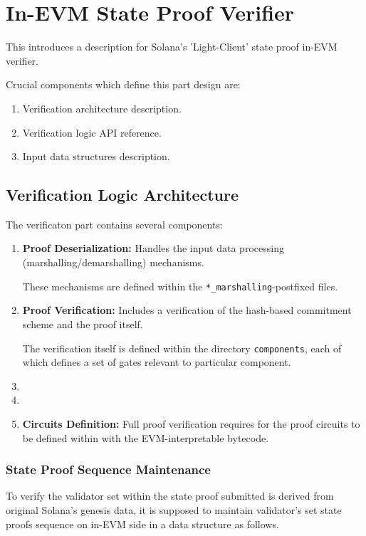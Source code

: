 \chapter{In-EVM State Proof Verifier}

This introduces a description for Solana's 'Light-Client' state proof in-EVM
verifier.

Crucial components which define this part design are:
\begin{enumerate}
    \item Verification architecture description.
    \item Verification logic API reference.
    \item Input data structures description.
\end{enumerate}

\section{Verification Logic Architecture}

The verificaton part contains several components:
\begin{enumerate}
    \item \textbf{Proof Deserialization:} Handles the input data processing (marshalling/demarshalling) mechanisms.

    These mechanisms are defined within the \texttt{*\_marshalling}-postfixed files.

    \item \textbf{Proof Verification:} Includes a verification of the hash-based commitment scheme and the proof itself.

    The verification itself is defined within the directory \texttt{components}, each of which defines a set of gates
    relevant to particular component.

    \item \item \item \textbf{Circuits Definition:} Full proof verification requires for the proof circuits to be defined within
    with the EVM-interpretable bytecode.
\end{enumerate}

\subsection{State Proof Sequence Maintenance}
\label{subsec:stateseq}

To verify the validator set within the state proof submitted is derived from 
original Solana's genesis data, it is supposed to maintain validator's set state
proofs sequence on in-EVM side in a data structure as follows.

